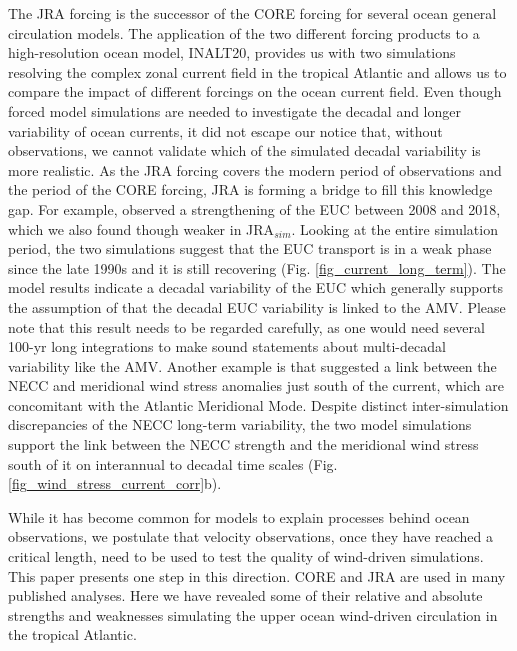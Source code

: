 \documentclass[os, manuscript]{copernicus}
\begin{document}
	The JRA forcing is the successor of the CORE forcing for several ocean general circulation models. The application of the two different forcing products to a high-resolution ocean model, INALT20, provides us with two simulations resolving the complex zonal current field in the tropical Atlantic and allows us to compare the impact of different forcings on the ocean current field. Even though forced model simulations are needed to investigate the decadal and longer variability of ocean currents, it did not escape our notice that, without observations, we cannot validate which of the simulated decadal variability is more realistic. As the JRA forcing covers the modern period of observations and the period of the CORE forcing, JRA is forming a bridge to fill this knowledge gap. For example, \cite{Brandt2021a} observed a strengthening of the EUC between 2008 and 2018, which we also found though weaker in JRA$_{sim}$. Looking at the entire simulation period, the two simulations suggest that the EUC transport is in a weak phase since the late 1990s and it is still recovering (Fig. \ref{fig_current_long_term}). The model results indicate a decadal variability of the EUC which generally supports the assumption of \cite{Brandt2021a} that the decadal EUC variability is linked to the AMV. Please note that this result needs to be regarded carefully, as one would need several 100-yr long integrations to make sound statements about multi-decadal variability like the AMV. Another example is that \cite{Goes2013} suggested a link between the NECC and meridional wind stress anomalies just south of the current, which are concomitant with the Atlantic Meridional Mode. Despite distinct inter-simulation discrepancies of the NECC long-term variability, the two model simulations support the link between the NECC strength and the meridional wind stress south of it on interannual to decadal time scales (Fig. \ref{fig_wind_stress_current_corr}b).
	
	While it has become common for models to explain processes behind ocean observations, we postulate that velocity observations, once they have reached a critical length, need to be used to test the quality of wind-driven simulations. This paper presents one step in this direction. CORE and JRA are used in many published analyses. Here we have revealed some of their relative and absolute strengths and weaknesses simulating the upper ocean wind-driven circulation in the tropical Atlantic.
	
	
\end{document}
